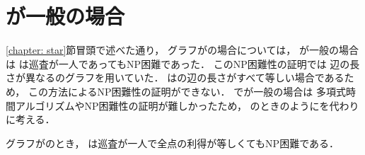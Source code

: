 \section{{\maxIdletime}が一般の場合}
\ref{chapter: star}節冒頭で述べた通り，
グラフが{\graphStar}の場合については，
{\maxIdletime}が一般の場合は
{\patProb}は巡査が一人であってもNP困難であった\cite[Theorem~6]{coene2011charlemagne}．
このNP困難性の証明では
辺の長さが異なる{\graphStar}のグラフを用いていた．
{\graphUnit}は{\graphStar}の辺の長さがすべて等しい場合であるため，
この方法によるNP困難性の証明ができない．
{\graphUnit}で{\maxIdletime}が一般の場合は
多項式時間アルゴリズムやNP困難性の証明が難しかったため，
{\graphLine}のときのように{\timeSpecifiedPatProb}を代わりに考える．


\begin{theo}
  \label{theo:UnitExacIdletimeNPhard}
  グラフが{\graphUnit}のとき，
  {\timeSpecifiedPatProb}は巡査が一人で全点の利得が等しくてもNP困難である．
  \end{theo}

